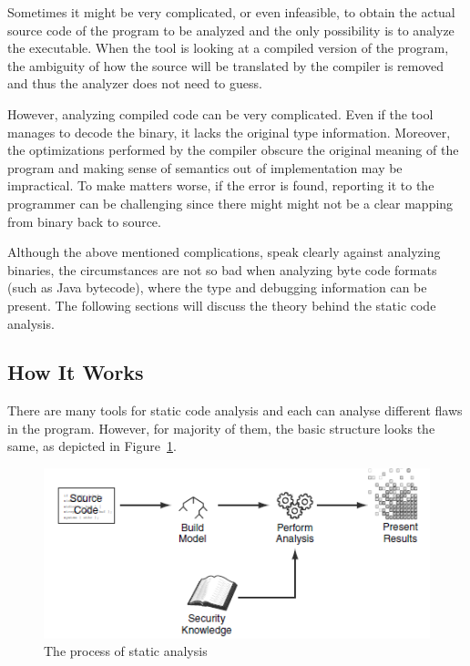 \documentclass[
  digital, %
  table,   %
  lof,     %
  lot,     %
  oneside,
]{fithesis3}
\begin{document}
Sometimes it might be very complicated, or even infeasible, to obtain the actual source code of the program to be analyzed and the only possibility is to analyze the executable. When the tool is looking at a compiled version of the program, the ambiguity of how the source will be translated by the compiler is removed and thus the analyzer does not need to guess. 

However, analyzing compiled code can be very complicated. Even if the tool manages to decode the binary, it lacks the original type information. Moreover, the optimizations performed by the compiler obscure the original meaning of the program and making sense of semantics out of implementation may be impractical. To make matters worse, if the error is found, reporting it to the programmer can be challenging since there might might not be a clear mapping from binary back to source. 

Although the above mentioned complications, speak clearly against analyzing binaries, the circumstances are not so bad when analyzing byte code formats (such as Java bytecode), where the type and debugging information can be present. The following sections will discuss the theory behind the static code analysis.

\subsection{How It Works}
There are many tools for static code analysis and each can analyse different flaws in the program. However, for majority of them, the basic structure looks the same, as depicted in Figure~\ref{fig:static-code-analysis-internals}.

\begin{figure}[h!]
		\centering
			\includegraphics[scale=0.75]{img/static-code-analysis-internals}
		\caption{The process of static analysis~\cite{secure-programming-sca}}
		\label{fig:static-code-analysis-internals}
\end{figure}
\end{document}

